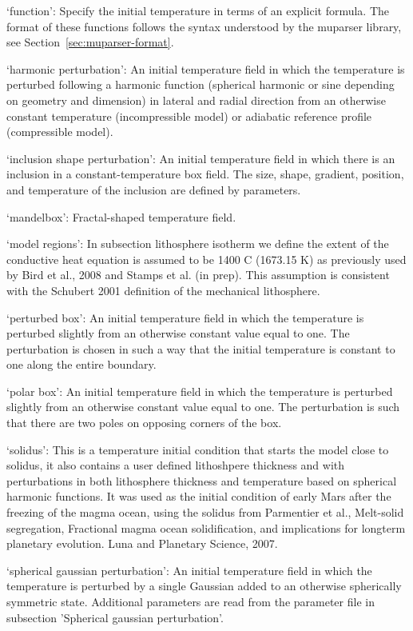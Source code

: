 \begin{itemize}
`function': Specify the initial temperature in terms of an explicit formula. The format of these functions follows the syntax understood by the muparser library, see Section~\ref{sec:muparser-format}.

`harmonic perturbation': An initial temperature field in which the temperature is perturbed following a harmonic function (spherical harmonic or sine depending on geometry and dimension) in lateral and radial direction from an otherwise constant temperature (incompressible model) or adiabatic reference profile (compressible model).

`inclusion shape perturbation': An initial temperature field in which there is an inclusion in a constant-temperature box field. The size, shape, gradient, position, and temperature of the inclusion are defined by parameters.

`mandelbox': Fractal-shaped temperature field.

`model regions': In subsection lithosphere isotherm we define the extent of the conductive heat equation is assumed to be 1400 C (1673.15 K) as previously used by Bird et al., 2008 and Stamps et al. (in prep). This assumption is consistent with the Schubert 2001 definition of the mechanical lithosphere.

`perturbed box': An initial temperature field in which the temperature is perturbed slightly from an otherwise constant value equal to one. The perturbation is chosen in such a way that the initial temperature is constant to one along the entire boundary.

`polar box': An initial temperature field in which the temperature is perturbed slightly from an otherwise constant value equal to one. The perturbation is such that there are two poles on opposing corners of the box. 

`solidus': This is a temperature initial condition that starts the model close to solidus, it also contains a user defined lithoshpere thickness and with perturbations  in both lithosphere thickness and temperature based on spherical harmonic functions. It was used as the initial condition of early Mars after the freezing of the magma ocean, using the solidus from Parmentier et al., Melt-solid segregation, Fractional magma ocean solidification, and implications for longterm planetary evolution. Luna and Planetary Science, 2007.

`spherical gaussian perturbation': An initial temperature field in which the temperature is perturbed by a single Gaussian added to an otherwise spherically symmetric state. Additional parameters are read from the parameter file in subsection 'Spherical gaussian perturbation'.


\end{itemize}

